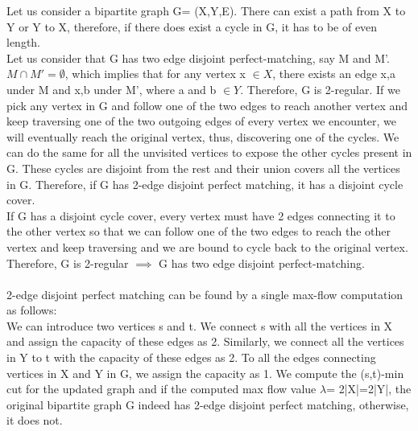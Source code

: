 \documentclass[12pt]{article}
\begin{document}
Let us consider a bipartite graph G= (X,Y,E). There can exist a path 
from X to Y or Y to X, therefore, if there does exist a cycle in G, it 
has to be of even length. \\
Let us consider that G has two edge 
disjoint perfect-matching, say M and M'. $M \cap M' = \emptyset $, which 
implies that for any vertex x $\in X$, there exists an edge x,a under M and 
x,b under M', where a and b $\in Y$. Therefore, G is 2-regular. If we pick 
any vertex in G and follow one of the two edges to reach another vertex and keep 
traversing one of the two outgoing edges of every vertex we encounter, we 
will eventually reach the original vertex, thus, discovering one of the cycles.
We can do the same for all the unvisited vertices to expose the other cycles 
present in G. These cycles are disjoint from the rest and their union 
covers all the vertices in G. Therefore, if G has 2-edge disjoint 
perfect matching, it has a disjoint cycle cover. \\
If G has a disjoint cycle cover, every vertex must have 2 edges connecting it 
to the other vertex so that we can follow one of the two edges to reach the other 
vertex and keep traversing and we are bound to cycle back to the 
original vertex. Therefore, G is 2-regular $\implies$ G has two edge 
disjoint perfect-matching. \\ \\

2-edge disjoint perfect matching can be found by a single max-flow computation
as follows: \\
We can introduce two vertices s and t. We connect s with all the 
vertices in X and assign the capacity of these edges as 2. Similarly,
we connect all the vertices in Y to t with the capacity of these edges as 2.
To all the edges connecting vertices in X and Y in G, we assign the capacity 
as 1. We compute the (s,t)-min cut for the updated graph and if the 
computed max flow value $\lambda$=
2|X|=2|Y|, the original bipartite graph G indeed has 2-edge disjoint perfect matching, 
otherwise, it does not.
\end{document}
